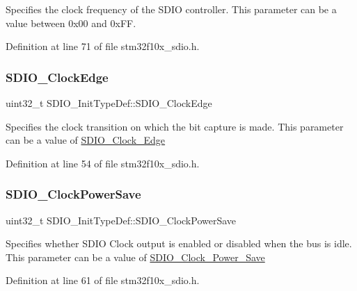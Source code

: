 Specifies the clock frequency of the S\+D\+IO controller. This parameter can be a value between 0x00 and 0x\+FF. 

Definition at line 71 of file stm32f10x\+\_\+sdio.\+h.

\mbox{\label{struct_s_d_i_o___init_type_def_a3252c846b68988b8ae70ca0d40030a52}} 
\subsubsection{\texorpdfstring{S\+D\+I\+O\+\_\+\+Clock\+Edge}{SDIO\_ClockEdge}}
{\footnotesize\ttfamily uint32\+\_\+t S\+D\+I\+O\+\_\+\+Init\+Type\+Def\+::\+S\+D\+I\+O\+\_\+\+Clock\+Edge}

Specifies the clock transition on which the bit capture is made. This parameter can be a value of \hyperlink{group___s_d_i_o___clock___edge}{S\+D\+I\+O\+\_\+\+Clock\+\_\+\+Edge} 

Definition at line 54 of file stm32f10x\+\_\+sdio.\+h.

\mbox{\label{struct_s_d_i_o___init_type_def_ac236cc5a376a65b9de64a31dab816364}} 
\subsubsection{\texorpdfstring{S\+D\+I\+O\+\_\+\+Clock\+Power\+Save}{SDIO\_ClockPowerSave}}
{\footnotesize\ttfamily uint32\+\_\+t S\+D\+I\+O\+\_\+\+Init\+Type\+Def\+::\+S\+D\+I\+O\+\_\+\+Clock\+Power\+Save}

Specifies whether S\+D\+IO Clock output is enabled or disabled when the bus is idle. This parameter can be a value of \hyperlink{group___s_d_i_o___clock___power___save}{S\+D\+I\+O\+\_\+\+Clock\+\_\+\+Power\+\_\+\+Save} 

Definition at line 61 of file stm32f10x\+\_\+sdio.\+h.


